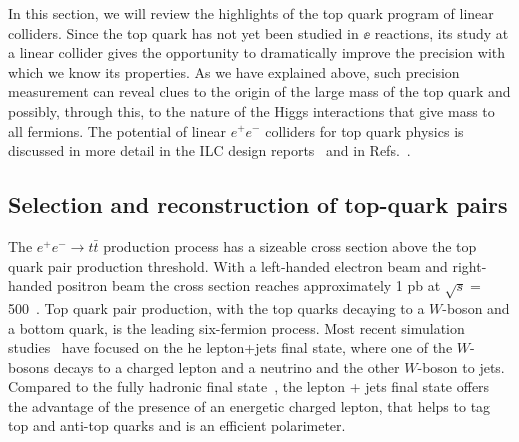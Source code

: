 



In this section, we will review the  highlights of the top quark
program of linear colliders.     Since the top quark has not yet been
studied in $\ee$  reactions,  its study at a linear collider gives the
opportunity to dramatically improve the precision with which we know
its properties.   As we have explained above, such precision
measurement can reveal clues to the origin of the large mass of the
top quark and possibly, through this, to the nature of the Higgs
interactions that give mass to all fermions.
The potential of linear $e^+e^-$ colliders for top quark physics is
discussed in more detail in the 
ILC design reports~\cite{Baer:2013cma,Behnke:2013lya}
and in Refs.~\cite{Agashe:2013hma,Vos:2016til,Abramowicz:2018rjq}.

\subsection{Selection and reconstruction of top-quark pairs}
\label{subsec:top:reco}

The $e^+e^- \rightarrow t\bar{t}$ production process has a sizeable cross section above
the top quark pair production threshold. With a left-handed electron beam and right-handed
positron beam the cross section reaches approximately 1 pb at $\sqrt{s}=$ 500~\GeV{}. 
Top quark pair production, with the top quarks decaying to a $W$-boson and a bottom quark,
is the leading six-fermion process. Most recent simulation
studies~\cite{Amjad:2015mma,Bernreuther:2017cyi,Abramowicz:2018rjq}
have focused on the he lepton+jets final state, where one of the $W$-bosons decays to a charged
lepton and a neutrino and the other $W$-boson to jets. Compared to the fully hadronic 
final state~\cite{Devetak:2010na}, the lepton + jets final state offers the advantage of the presence of an energetic
charged lepton, that helps to tag top and anti-top quarks and is an efficient polarimeter.

